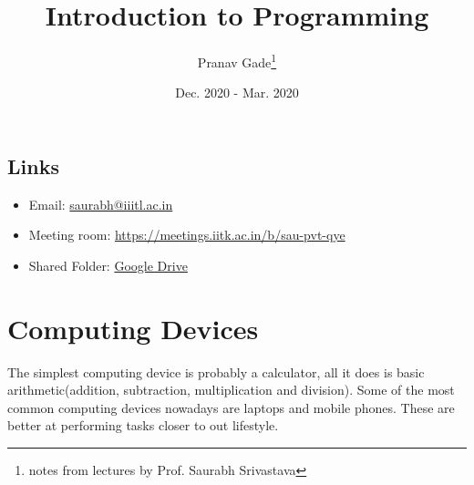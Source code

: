 \documentclass[10pt, a4paper]{report}
\author{Pranav Gade\thanks{notes from lectures by Prof. Saurabh Srivastava}}
\date{Dec. 2020 - Mar. 2020}
\title{Introduction to Programming}
\begin{document}
	\maketitle
	\tableofcontents
	\section*{Links}
	\begin{itemize}
		\item Email: \href{mailto:saurabh@iiitl.ac.in}{saurabh@iiitl.ac.in}
		\item Meeting room: \href{https://meetings.iitk.ac.in/b/sau-pvt-qye}{https://meetings.iitk.ac.in/b/sau-pvt-qye}
		\item Shared Folder: \href{https://drive.google.com/drive/folders/1SxSwW\_9C1nrGAwu12QV1FejA4IWp5ZIP?usp=sharing\_eip\&ts=5fcdaf02}{Google Drive}
	\end{itemize}
	\newpage
	
	\chapter{Computing Devices}
		The simplest computing device is probably a calculator, all it does is basic arithmetic(addition, subtraction, multiplication and division). Some of the most common computing devices nowadays are laptops and mobile phones. These are better at performing tasks closer to out lifestyle.
		
\end{document}
